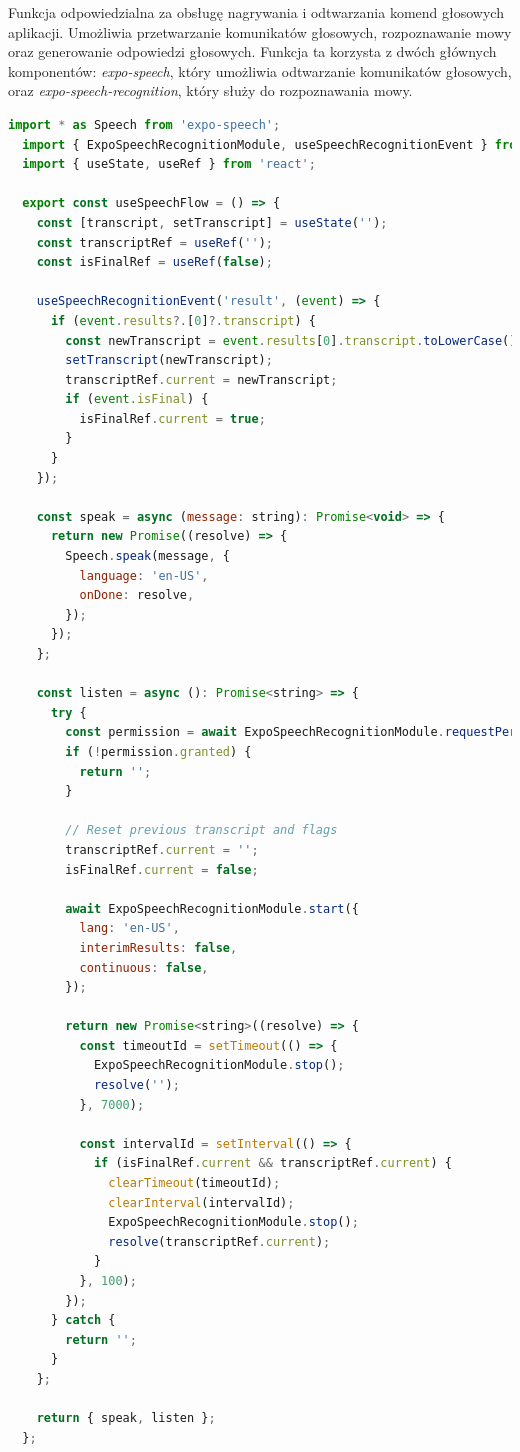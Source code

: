 Funkcja odpowiedzialna za obsługę nagrywania i odtwarzania komend głosowych aplikacji. Umożliwia przetwarzanie komunikatów głosowych, rozpoznawanie mowy oraz generowanie odpowiedzi głosowych. Funkcja ta korzysta z dwóch głównych komponentów: \textit{expo-speech}, który umożliwia odtwarzanie komunikatów głosowych, oraz \textit{expo-speech-recognition}, który służy do rozpoznawania mowy.

\begin{lstlisting}[language=JavaScript, caption=useSpeechFlowHook, label=lst:speechFlow]
  import * as Speech from 'expo-speech';
  import { ExpoSpeechRecognitionModule, useSpeechRecognitionEvent } from 'expo-speech-recognition';
  import { useState, useRef } from 'react';
  
  export const useSpeechFlow = () => {
    const [transcript, setTranscript] = useState('');
    const transcriptRef = useRef('');
    const isFinalRef = useRef(false);
  
    useSpeechRecognitionEvent('result', (event) => {
      if (event.results?.[0]?.transcript) {
        const newTranscript = event.results[0].transcript.toLowerCase();
        setTranscript(newTranscript);
        transcriptRef.current = newTranscript;
        if (event.isFinal) {
          isFinalRef.current = true;
        }
      }
    });
  
    const speak = async (message: string): Promise<void> => {
      return new Promise((resolve) => {
        Speech.speak(message, {
          language: 'en-US',
          onDone: resolve,
        });
      });
    };
  
    const listen = async (): Promise<string> => {
      try {
        const permission = await ExpoSpeechRecognitionModule.requestPermissionsAsync();
        if (!permission.granted) {
          return '';
        }
  
        // Reset previous transcript and flags
        transcriptRef.current = '';
        isFinalRef.current = false;
  
        await ExpoSpeechRecognitionModule.start({
          lang: 'en-US',
          interimResults: false,
          continuous: false,
        });
  
        return new Promise<string>((resolve) => {
          const timeoutId = setTimeout(() => {
            ExpoSpeechRecognitionModule.stop();
            resolve('');
          }, 7000);
  
          const intervalId = setInterval(() => {
            if (isFinalRef.current && transcriptRef.current) {
              clearTimeout(timeoutId);
              clearInterval(intervalId);
              ExpoSpeechRecognitionModule.stop();
              resolve(transcriptRef.current);
            }
          }, 100);
        });
      } catch {
        return '';
      }
    };
  
    return { speak, listen };
  };
\end{lstlisting}
  
